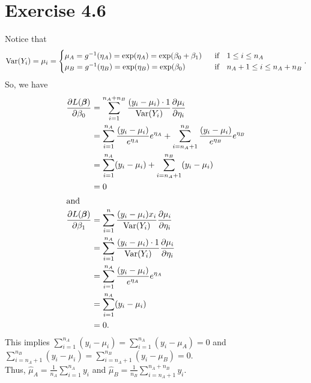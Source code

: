 \section*{Exercise 4.6}
Notice that
\begin{align*}
\mathrm{Var}(Y_{i}) = \mu_{i} =
\begin{cases}
\mu_{A} = g^{-1}(\eta_{A}) = \exp(\eta_{A}) = \exp(\beta_{0} + \beta_{1}) ~~&\mbox{if}~~~ 1 \leq i \leq n_{A}\\
\mu_{B} = g^{-1}(\eta_{B}) = \exp(\eta_{B}) = \exp(\beta_{0}) ~~&\mbox{if}~~~ n_{A}+1 \leq i \leq n_{A}+n_{B}\\
\end{cases}.
\end{align*}
So, we have
\begin{align*}
\frac{\partial L(\bm{\beta})}{\partial \beta_{0}} &= \sum_{i=1}^{n_{A}+n_{B}}\frac{(y_{i}-\mu_{i})\cdot 1}{\mathrm{Var}(Y_{i})}\frac{\partial \mu_{i}}{\partial \eta_{i}}\\
&= \sum_{i=1}^{n_{A}}\frac{(y_{i}-\mu_{i})}{e^{\eta_{A}}}e^{\eta_{A}} + \sum_{i=n_{A}+1}^{n_{B}}\frac{(y_{i}-\mu_{i})}{e^{\eta_{B}}}e^{\eta_{B}}\\
&= \sum_{i=1}^{n_{A}}(y_{i}-\mu_{i}) + \sum_{i=n_{A}+1}^{n_{B}}(y_{i}-\mu_{i})\\
&= 0\\ \intertext{and}
\frac{\partial L(\bm{\beta})}{\partial \beta_{1}} &= \sum_{i=1}^{n}\frac{(y_{i}-\mu_{i})x_{i}}{\mathrm{Var}(Y_{i})}\frac{\partial \mu_{i}}{\partial \eta_{i}}\\
&= \sum_{i=1}^{n_{A}}\frac{(y_{i}-\mu_{i})\cdot 1}{\mathrm{Var}(Y_{i})}\frac{\partial \mu_{i}}{\partial \eta_{i}}\\
&= \sum_{i=1}^{n_{A}}\frac{(y_{i}-\mu_{i})}{e^{\eta_{A}}}e^{\eta_{A}}\\
&= \sum_{i=1}^{n_{A}}(y_{i}-\mu_{i})\\
&= 0.
\end{align*}
This implies $\sum_{i=1}^{n_{A}}(y_{i}-\mu_{i}) = \sum_{i=1}^{n_{A}}(y_{i}-\mu_{A}) = 0$ and $\sum_{i=n_{A}+1}^{n_{B}}(y_{i}-\mu_{i}) = \sum_{i=n_{A}+1}^{n_{B}}(y_{i}-\mu_{B}) = 0$.\\
Thus, $\widehat{\mu}_{A} = \frac{1}{n_{A}}\sum_{i=1}^{n_{A}} y_{i}$ and $\widehat{\mu}_{B} = \frac{1}{n_{B}}\sum_{i=n_{A}+1}^{n_{A}+n_{B}} y_{i}$.
